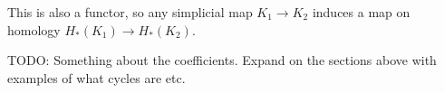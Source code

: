 This is also a functor, so any simplicial map $K_{1} \to K_{2}$ induces a map on homology $H_{*}(K_{1}) \to H_{*}(K_{2})$.

TODO: Something about the coefficients. Expand on the sections above with examples of what cycles are etc.

